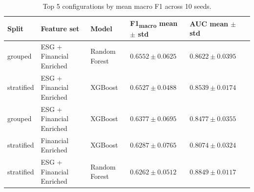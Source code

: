 \begin{table}[htbp]
  \centering
  \caption{Top 5 configurations by mean macro F1 across 10 seeds.}
  \label{tab:top5_f1}
  \begin{tabular}{llllll}
    \toprule
    Split & Feature set & Model & F1\textsubscript{macro} mean $\pm$ std & AUC mean $\pm$ std \\
    \midrule
    grouped & ESG + Financial Enriched & Random Forest & $0.6552 \pm 0.0625$ & $0.8622 \pm 0.0395$ \\
    stratified & ESG + Financial Enriched & XGBoost & $0.6527 \pm 0.0488$ & $0.8539 \pm 0.0174$ \\
    grouped & ESG + Financial Enriched & XGBoost & $0.6377 \pm 0.0695$ & $0.8477 \pm 0.0355$ \\
    stratified & Financial Enriched & XGBoost & $0.6287 \pm 0.0765$ & $0.8074 \pm 0.0324$ \\
    stratified & ESG + Financial Enriched & Random Forest & $0.6262 \pm 0.0512$ & $0.8849 \pm 0.0117$ \\
    \bottomrule
  \end{tabular}
\end{table}